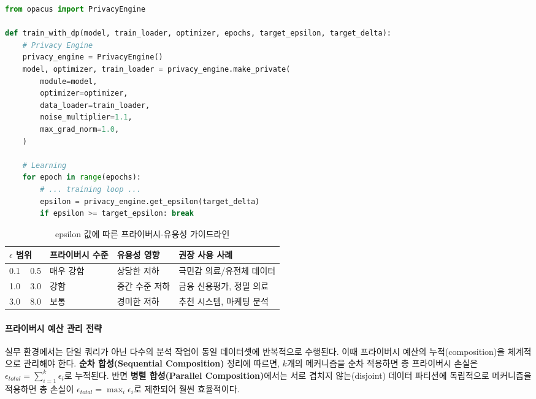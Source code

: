 \begin{lstlisting}[language=Python, caption={Differential Privacy Training based on DP-SGD (using Opacus)}, label={lst:dp_sgd}]
from opacus import PrivacyEngine

def train_with_dp(model, train_loader, optimizer, epochs, target_epsilon, target_delta):
    # Privacy Engine
    privacy_engine = PrivacyEngine()
    model, optimizer, train_loader = privacy_engine.make_private(
        module=model,
        optimizer=optimizer,
        data_loader=train_loader,
        noise_multiplier=1.1,
        max_grad_norm=1.0,
    )

    # Learning
    for epoch in range(epochs):
        # ... training loop ...
        epsilon = privacy_engine.get_epsilon(target_delta)
        if epsilon >= target_epsilon: break
\end{lstlisting}

\begin{table}[htbp]
\centering
\caption{epsilon 값에 따른 프라이버시-유용성 가이드라인}
\label{tab:dp_epsilon}
\begin{tabularx}{\textwidth}{p{2cm}p{3cm}p{3cm}X}
\toprule
\textbf{$\epsilon$ 범위} & \textbf{프라이버시 수준} & \textbf{유용성 영향} & \textbf{권장 사용 사례} \\
\midrule
0.1 ~ 0.5 & 매우 강함 & 상당한 저하 & 극민감 의료/유전체 데이터 \\
1.0 ~ 3.0 & 강함 & 중간 수준 저하 & 금융 신용평가, 정밀 의료 \\
3.0 ~ 8.0 & 보통 & 경미한 저하 & 추천 시스템, 마케팅 분석 \\
\bottomrule
\end{tabularx}
\end{table}

\paragraph{프라이버시 예산 관리 전략}

실무 환경에서는 단일 쿼리가 아닌 다수의 분석 작업이 동일 데이터셋에 반복적으로 수행된다. 이때 프라이버시 예산의 누적(composition)을 체계적으로 관리해야 한다. \textbf{순차 합성(Sequential Composition)} 정리에 따르면, $k$개의 메커니즘을 순차 적용하면 총 프라이버시 손실은 $\epsilon_{total} = \sum_{i=1}^{k} \epsilon_i$로 누적된다. 반면 \textbf{병렬 합성(Parallel Composition)}에서는 서로 겹치지 않는(disjoint) 데이터 파티션에 독립적으로 메커니즘을 적용하면 총 손실이 $\epsilon_{total} = \max_i \epsilon_i$로 제한되어 훨씬 효율적이다.

